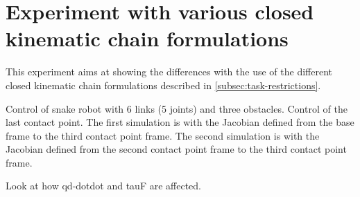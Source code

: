 \section{Experiment with various closed kinematic chain formulations}

This experiment aims at showing the differences with the use of the different closed kinematic chain formulations described in \ref{subsec:task-restrictions}.

Control of snake robot with 6 links (5 joints) and three obstacles. Control of the last contact point. The first simulation is with the Jacobian defined from the base frame to the third contact point frame. The second simulation is with the Jacobian defined from the second contact point frame to the third contact point frame.

Look at how qd-dotdot and tauF are affected.